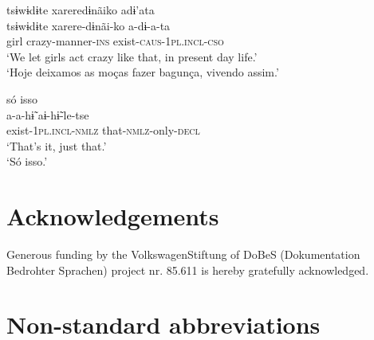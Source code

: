 \documentclass[output=paper,
modfonts,nonflat
]{langsci/langscibook}
\begin{document}
\ea tsɨwɨdɨte xareredɨnãiko adɨ'ata\\[.3em]
\gll tsɨwɨdɨte	xarere-dɨnãi-ko	a-dɨ-a-ta\\
girl			crazy-manner-\textsc{ins}	exist-\textsc{caus-1pl.incl-cso}\\
\glt ‘We let girls act crazy like that, in present day life.’\\
‘Hoje deixamos as moças fazer bagunça, vivendo assim.'
\z

\ea só isso\\[.3em]
\gll a-a-hɨ̃		aɨ-hɨ̃-le-tse{\footnotemark}\\
exist-\textsc{1pl.incl-nmlz}	that-\textsc{nmlz}-only-\textsc{decl}\\
\glt ‘That’s it, just that.’\\
‘Só isso.'
\z

\section*{Acknowledgements}
Generous funding by the VolkswagenStiftung of DoBeS (Dokumentation Bedrohter Sprachen) project nr. 85.611 is hereby gratefully acknowledged.

\section*{Non-standard abbreviations}
\end{document}
